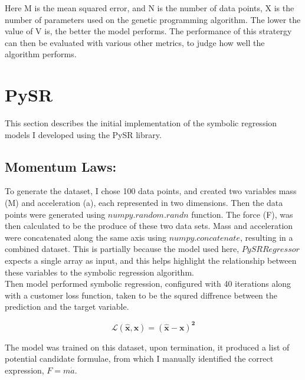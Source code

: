 \documentclass{article}
\begin{document}
Here M is the mean squared error, and N is the number of data points, X is the number of parameters used on the genetic programming algorithm. The lower the value of V is, the better the model performs. The performance of this stratergy can then be evaluated with various other metrics, to judge how well the algorithm performs. \\ 




\section{PySR}

This section describes the initial implementation of the symbolic regression models I developed using the PySR library.\\

\subsection{Momentum Laws: }

To generate the dataset, I chose 100 data points, and created two variables mass (M) and acceleration (a), each represented in two dimensions. Then the data points were generated using $numpy.random.randn$ function. The force (F), was then calculated to be the produce of these two data sets. Mass and acceleration were concatenated along the same axis using $numpy.concatenate$, resulting in a combined dataset. This is partially because the model used here, $PySRRegressor$ expects a single array as input, and this helps highlight the relationship between these variables to the symbolic regression algorithm.\\ 

Then model performed symbolic regression, configured with 40 iterations along with a customer loss function, taken to be the squred diffrence between the prediction and the target variable. \\ 

\begin{center}
  
  $$
  {\boldsymbol{\mathcal{L}(\hat{x}, x) = (\hat{x} - x)^2}}
$$

\end{center}


The model was trained on this dataset, upon termination, it produced a list of potential candidate formulae, from which I manually identified the correct expression, $F = m \dot a$. \\
\end{document}
